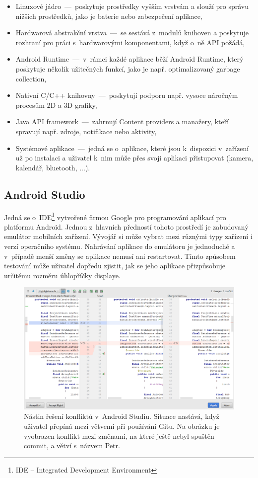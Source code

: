 \begin{itemize}
\item Linuxové jádro \,---\, poskytuje prostředky vyšším vrstvám a slouží pro správu nižších prostředků, jako je baterie nebo zabezpečení aplikace,
\item Hardwarová abstrakční vrstva \,---\, se sestává z~modulů knihoven a poskytuje rozhraní pro práci s~hardwarovými komponentami, když o~ně API požádá,
\item Android Runtime \,---\, v~rámci každé aplikace běží Android Runtime, který poskytuje několik užitečných funkcí, jako je např. optimalizovaný garbage collection,
\item Nativní C/C++ knihovny \,---\, poskytují podporu např. vysoce náročným procesům 2D a 3D grafiky,
\item Java API framework \,---\, zahrnují Content providers a manažery, kteří spravují např. zdroje, notifikace nebo aktivity,
\item Systémové aplikace \,---\, jedná se o~aplikace, které jsou k~dispozici v~zařízení už po instalaci a uživatel k~nim může přes svoji aplikaci přistupovat (kamera, kalendář, bluetooth, ...).
\end{itemize}

\subsection*{Android Studio}
Jedná se o~IDE\footnote{IDE -- Integrated Development Environment} vytvořené firmou Google pro programování aplikací pro platformu Android. Jednou z~hlavních předností tohoto prostředí je zabudovaný emulátor mobilních zařízení. Vývojář si může vybrat mezi různými typy zařízení i verzí operačního systému. Nahrávání aplikace do emulátoru je jednoduché a v~případě menší změny se aplikace nemusí ani restartovat. Tímto způsobem testování může uživatel dopředu zjistit, jak se jeho aplikace přizpůsobuje určitému rozměru úhlopříčky displaye. 

\begin{figure}
\centering
\includegraphics[width= 15cm]{obrazky-figures/resolving_conflicts1}
\caption{Nástin řešení konfliktů v~Android Studiu. Situace nastává, když uživatel přepíná mezi větvemi při používání Gitu. Na obrázku je vyobrazen konflikt mezi změnami, na které ještě nebyl spuštěn commit, a větví s~názvem Petr.}
\label{resolv}
\end{figure}

